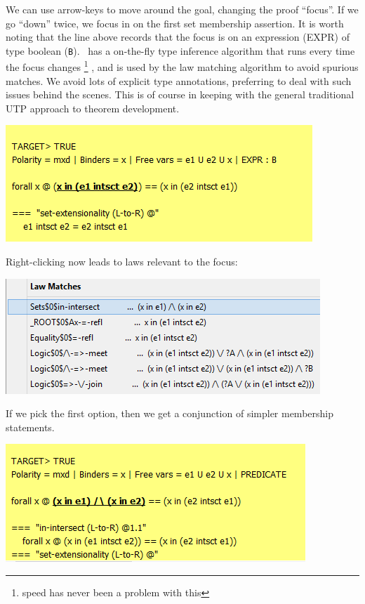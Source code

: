 \noindent
We can use arrow-keys to move around the goal, changing the proof ``focus''.
If we go ``down'' twice, we focus in on the first set membership assertion.
It is worth noting that the line above records that the focus is on an expression (EXPR)
of type boolean (\texttt{B}). \ has a on-the-fly type inference algorithm that runs
every time the focus changes%
\footnote{speed has never been a problem with this}%
, and is used by the law matching algorithm to avoid spurious matches.
We avoid lots of explicit type annotations, preferring to deal with such issues
behind the scenes. This is of course in keeping with the general traditional UTP approach
to theorem development.

\includegraphics[scale=0.5]{11-moving-down-again.png}

\noindent
Right-clicking now leads to laws relevant to the focus:

\includegraphics[scale=0.5]{12-laws-applicable-to-focus.png}

\noindent
If we pick the first option, then we get a conjunction of simpler membership statements.

\includegraphics[scale=0.5]{13-intersect-axiom-applied.png}

